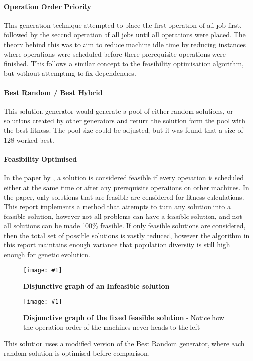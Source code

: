 \documentclass[14pt]{acmsiggraph}
\newcommand{\figuremacroW}[4]{
	\begin{figure}[h] %
		\centering
		\texttt{[image: \#1]}
		\caption[#2]{\textbf{#2} - #3}
		\label{fig:#1}
	\end{figure}
}
\begin{document}
\paragraph{Operation Order Priority}
This generation technique attempted to place the first operation of all job first, followed by the second operation of all jobs until all operations were placed. The theory behind this was to aim to reduce machine idle time by reducing instances where operations were scheduled before there prerequisite operations were finished. This follows a similar concept to the feasibility optimisation algorithm, but without attempting to fix dependencies.

\paragraph{Best Random / Best Hybrid}
This solution generator would generate a pool of either random solutions, or solutions created by other generators and return the solution form the pool with the best fitness. The pool size could be adjusted, but it was found that a size of 128 worked best.

\paragraph{Feasibility Optimised}
In the paper by \cite{wang2012new}, a solution is considered feasible if every operation is scheduled either at the same time or after any prerequisite operations on other machines. In the paper, only solutions that are feasible are considered for fitness calculations. This report implements a method that attempts to turn any solution into a feasible solution, however not all problems can have a feasible solution, and not all solutions can be made 100\% feasible. If only feasible solutions are considered, then the total set of possible solutions is vastly reduced, however the algorithm in this report maintains enough variance that population diversity is still high enough for genetic evolution. 

\figuremacroW
{infeasible}
{Disjunctive graph of an Infeasible solution}
{\cite{wang2012new}}
{1.0}
\figuremacroW
{good}
{Disjunctive graph of the fixed feasible solution}
{Notice how the operation order of the machines never heads to the left\cite{wang2012new}}
{1.0}

This solution uses a modified version of the Best Random generator, where each random solution is optimised before comparison.
\end{document}

